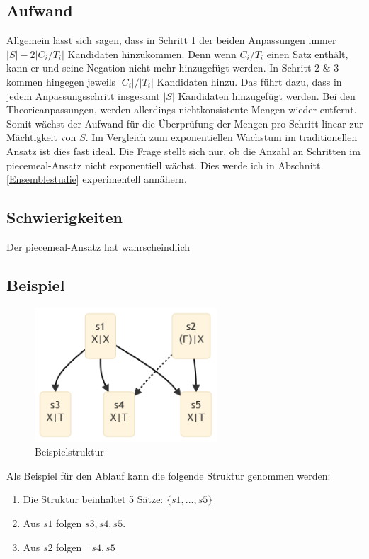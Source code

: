 \documentclass{article}
\begin{document}
\subsection{Aufwand}
Allgemein lässt sich sagen, dass in Schritt 1 der beiden Anpassungen immer $\lvert S \rvert - 2\lvert C_i/T_i \rvert$ Kandidaten hinzukommen. Denn wenn $C_i/T_i$ einen Satz enthält, kann er und seine Negation nicht mehr hinzugefügt werden. In Schritt 2 \& 3 kommen hingegen jeweils $\lvert C_i \rvert / \lvert T_i \rvert$ Kandidaten hinzu. Das führt dazu, dass in jedem Anpassungsschritt insgesamt $\lvert S \rvert$ Kandidaten hinzugefügt werden. Bei den Theorieanpassungen, werden allerdings nichtkonsistente Mengen wieder entfernt. Somit wächst der Aufwand für die Überprüfung der Mengen pro Schritt linear zur Mächtigkeit von $S$. Im Vergleich zum exponentiellen Wachstum im traditionellen Ansatz ist dies fast ideal. Die Frage stellt sich nur, ob die Anzahl an Schritten im piecemeal-Ansatz nicht exponentiell wächst. Dies werde ich in Abschnitt \ref{Ensemblestudie} experimentell annähern.

\subsection{Schwierigkeiten}
Der piecemeal-Ansatz hat wahrscheindlich


\subsection{Beispiel}
\begin{figure}[ht]
  \centering
  \includegraphics[width=\textwidth,height=5cm,keepaspectratio]{images/reduced_classical.png}
  \caption{Beispielstruktur\label{fig:classset-initial1}}
\end{figure}

 Als Beispiel für den Ablauf kann die folgende Struktur genommen werden:
 \begin{enumerate}
     \item Die Struktur beinhaltet 5 Sätze: $\{s1,...,s5\}$
     \item Aus $s1$ folgen $s3, s4, s5$.
     \item Aus $s2$ folgen $\neg s4, s5$
 \end{enumerate}
 
\end{document}
